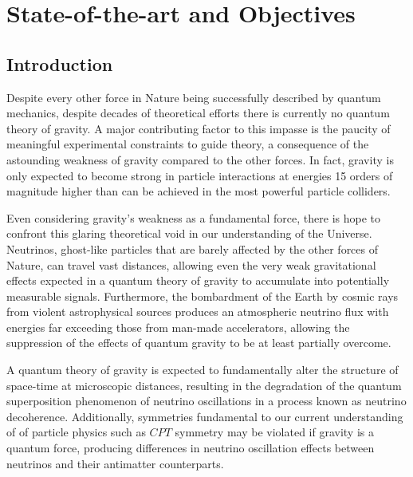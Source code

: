 \documentclass[a4paper,11pt]{article}
\newcounter{bar}
\begin{document}

\section{State-of-the-art and Objectives}
\vspace{0.1 cm}


\subsection{Introduction}

Despite every other force in Nature being successfully described by quantum mechanics, despite decades of theoretical efforts there is currently no quantum theory of gravity. A major contributing factor to this impasse is the paucity of meaningful experimental constraints to guide theory, a consequence of the astounding weakness of gravity compared to the other forces. In fact, gravity is only expected to become strong in particle interactions at energies 15 orders of magnitude higher than can be achieved in the most powerful particle colliders.

Even considering gravity's weakness as a fundamental force, there is hope to confront this glaring theoretical void in our understanding of the Universe. Neutrinos, ghost-like particles that are barely affected by the other forces of Nature, can travel vast distances, allowing even the very weak gravitational effects expected in a quantum theory of gravity to accumulate into potentially measurable signals. Furthermore, the bombardment of the Earth by cosmic rays from violent astrophysical sources produces an atmospheric neutrino flux with energies far exceeding those from man-made accelerators, allowing the suppression of the effects of quantum gravity to be at least partially overcome.

A quantum theory of gravity is expected to fundamentally alter the structure of space-time at microscopic distances, resulting in the degradation of the quantum superposition phenomenon of neutrino oscillations in a process known as neutrino decoherence. Additionally, symmetries fundamental to our current understanding of of particle physics such as $CPT$ symmetry may be violated if gravity is a quantum force, producing differences in neutrino oscillation effects between neutrinos and their antimatter counterparts. 
\end{document}
